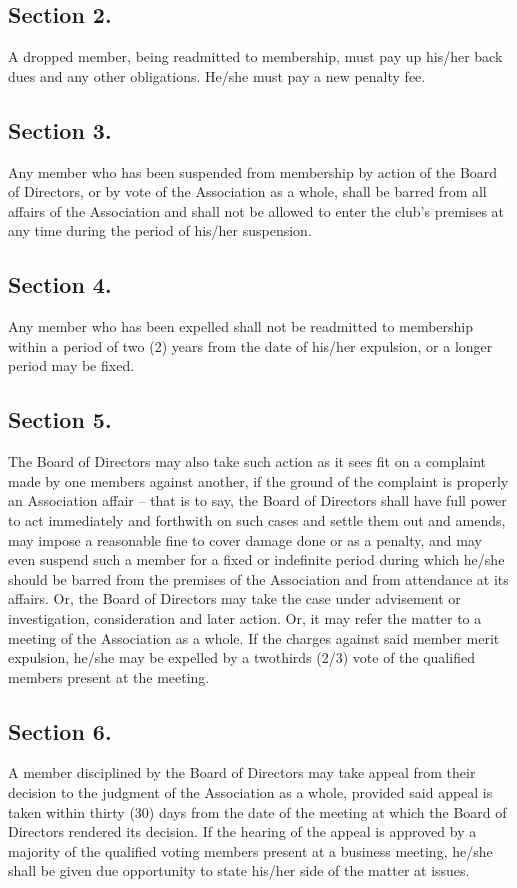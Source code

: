 \documentclass[12pt,letterpaper]{article}
\begin{document}
\subsection*{Section 2.} A dropped member, being readmitted to membership, must pay up his/her
back dues and any other obligations. He/she must pay a new penalty fee.
\subsection*{Section 3.} Any member who has been suspended from membership by action of the
Board of Directors, or by vote of the Association as a whole, shall be barred from all
affairs of the Association and shall not be allowed to enter the club’s premises at any
time during the period of his/her suspension.
\subsection*{Section 4.} Any member who has been expelled shall not be readmitted to membership
within a period of two (2) years from the date of his/her expulsion, or a longer period
may be fixed.
\subsection*{Section 5.} The Board of Directors may also take such action as it sees fit on a
complaint made by one members against another, if the ground of the complaint is
properly an Association affair – that is to say, the Board of Directors shall have full
power to act immediately and forthwith on such cases and settle them out and amends,
may impose a reasonable fine to cover damage done or as a penalty, and may even
suspend such a member for a fixed or indefinite period during which he/she should be
barred from the premises of the Association and from attendance at its affairs. Or, the
Board of Directors may take the case under advisement or investigation, consideration
and later action. Or, it may refer the matter to a meeting of the Association as a whole.
If the charges against said member merit expulsion, he/she may be expelled by a twothirds (2/3) vote of the qualified members present at the meeting.
\subsection*{Section 6.} A member disciplined by the Board of Directors may take appeal from their
decision to the judgment of the Association as a whole, provided said appeal is taken
within thirty (30) days from the date of the meeting at which the Board of Directors
rendered its decision. If the hearing of the appeal is approved by a majority of the
qualified voting members present at a business meeting, he/she shall be given due
opportunity to state his/her side of the matter at issues.
\end{document}
